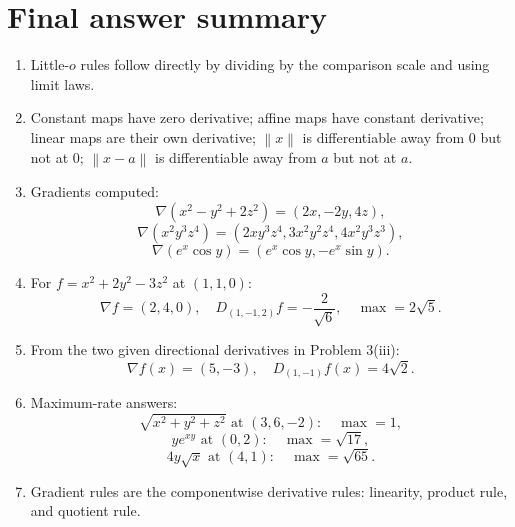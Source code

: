 \documentclass[11pt]{article}
\newcommand{\norm}[1]{\left\lVert #1\right\rVert}
\newcommand{\grad}{\nabla}
\begin{document}
\newpage
\section*{Final answer summary}

\begin{answerbox}
\begin{enumerate}[label=\textbf{\arabic*.},leftmargin=2em]
\item Little-$o$ rules follow directly by dividing by the comparison scale and using limit laws.
\item Constant maps have zero derivative; affine maps have constant derivative; linear maps are their own derivative; $\norm{x}$ is differentiable away from $0$ but not at $0$; $\norm{x-a}$ is differentiable away from $a$ but not at $a$.
\item Gradients computed:
\[
\grad(x^2-y^2+2z^2)=(2x,-2y,4z),
\]
\[
\grad(x^2y^3z^4)=(2xy^3z^4,3x^2y^2z^4,4x^2y^3z^3),
\]
\[
\grad(e^x\cos y)=(e^x\cos y,-e^x\sin y).
\]
\item For $f=x^2+2y^2-3z^2$ at $(1,1,0)$:
\[
\grad f=(2,4,0),\quad D_{(1,-1,2)}f=-\frac2{\sqrt6},\quad \max=2\sqrt5.
\]
\item From the two given directional derivatives in Problem 3(iii):
\[
\grad f(x)=(5,-3),\quad D_{(1,-1)}f(x)=4\sqrt2.
\]
\item Maximum-rate answers:
\[
\sqrt{x^2+y^2+z^2}\text{ at }(3,6,-2):\quad \max=1,
\]
\[
 ye^{xy}\text{ at }(0,2):\quad \max=\sqrt{17},
\]
\[
4y\sqrt{x}\text{ at }(4,1):\quad \max=\sqrt{65}.
\]
\item Gradient rules are the componentwise derivative rules: linearity, product rule, and quotient rule.
\end{enumerate}
\end{answerbox}
\end{document}
